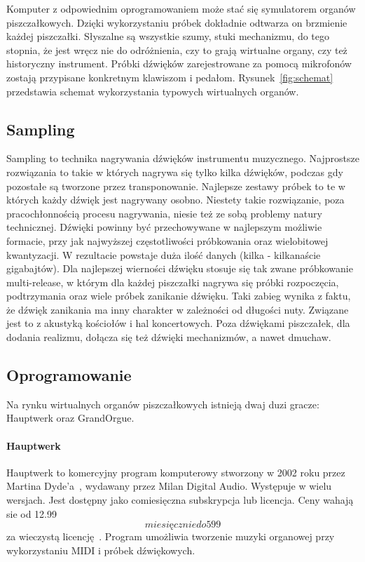 \documentclass[11pt]{report}
\begin{document}
    Komputer z odpowiednim oprogramowaniem może stać się symulatorem organów piszczałkowych.
    Dzięki wykorzystaniu próbek dokładnie odtwarza on brzmienie każdej piszczałki.
    Słyszalne są wszystkie szumy, stuki mechanizmu, do tego stopnia, że jest wręcz nie do odróżnienia, czy to grają wirtualne organy, czy też historyczny instrument.
    Próbki dźwięków zarejestrowane za pomocą mikrofonów zostają przypisane konkretnym klawiszom i pedałom.
    Rysunek~\ref{fig:schemat} przedstawia schemat wykorzystania typowych wirtualnych organów.


    \subsection{Sampling}
    Sampling to technika nagrywania dźwięków instrumentu muzycznego.
    Najprostsze rozwiązania to takie w których nagrywa się tylko kilka dźwięków, podczas gdy pozostałe są tworzone przez transponowanie.
    Najlepsze zestawy próbek to te w których każdy dźwięk jest nagrywany osobno.
    Niestety takie rozwiązanie, poza pracochłonnością procesu nagrywania, niesie też ze sobą problemy natury technicznej.
    Dźwięki powinny być przechowywane w najlepszym możliwie formacie, przy jak najwyższej częstotliwości próbkowania oraz wielobitowej kwantyzacji.
    W rezultacie powstaje duża ilość danych (kilka - kilkanaście gigabajtów).
    Dla najlepszej wierności dźwięku stosuje się tak zwane próbkowanie multi-release,
    w którym dla każdej piszczałki nagrywa się próbki rozpoczęcia, podtrzymania oraz wiele próbek zanikanie dźwięku.
    Taki zabieg wynika z faktu, że dźwięk zanikania ma inny charakter w zależności od długości nuty.
    Związane jest to z akustyką kościołów i hal koncertowych.
    Poza dźwiękami piszczałek, dla dodania realizmu, dołącza się też dźwięki mechanizmów, a nawet dmuchaw.


    \subsection{Oprogramowanie}

    Na rynku wirtualnych organów piszczałkowych istnieją dwaj duzi gracze: Hauptwerk oraz GrandOrgue.

    \paragraph{Hauptwerk}
    Hauptwerk to komercyjny program komputerowy stworzony w 2002 roku przez Martina Dyde'a~\cite{13115512220180101}, wydawany przez Milan Digital Audio.
    Występuje w wielu wersjach.
    Jest dostępny jako comiesięczna subskrypcja lub licencja.
    Ceny wahają sie od 12.99$$ miesięcznie do  599$$ za wieczystą licencję~\cite{hauptwerk}.
    Program umożliwia tworzenie muzyki organowej przy wykorzystaniu MIDI i próbek dźwiękowych.
\end{document}
